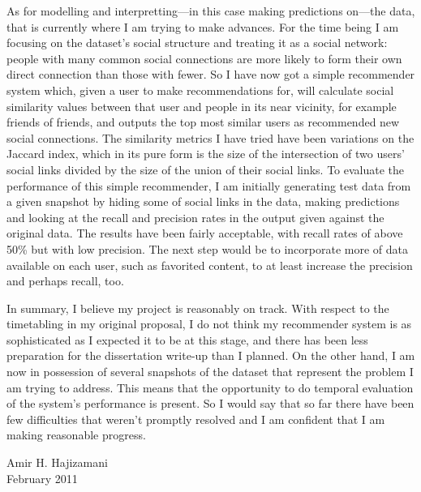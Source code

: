 \documentclass[a4paper,11pt,titlepage]{article}
\begin{document}
As for modelling and interpretting---in this case making predictions on---the data, that is currently where I am trying to make advances. For the time being I am focusing on the dataset's social structure and treating it as a social network: people with many common social connections are more likely to form their own direct connection than those with fewer. So I have now got a simple recommender system which, given a user to make recommendations for, will calculate social similarity values between that user and people in its near vicinity, for example friends of friends, and outputs the top most similar users as recommended new social connections. The similarity metrics I have tried have been variations on the Jaccard index, which in its pure form is the size of the intersection of two users' social links divided by the size of the union of their social links. To evaluate the performance of this simple recommender, I am initially generating test data from a given snapshot by hiding some of social links in the data, making predictions and looking at the recall and precision rates in the output given against the original data. The results have been fairly acceptable, with recall rates of above 50\% but with low precision. The next step would be to incorporate more of data available on each user, such as favorited content, to at least increase the precision and perhaps recall, too.

\bigskip

In summary, I believe my project is reasonably on track. With respect to the timetabling in my original proposal, I do not think my recommender system is as sophisticated as I expected it to be at this stage, and there has been less preparation for the dissertation write-up than I planned. On the other hand, I am now in possession of several snapshots of the dataset that represent the problem I am trying to address. This means that the opportunity to do temporal evaluation of the system's performance is present. So I would say that so far there have been few difficulties that weren't promptly resolved and I am confident that I am making reasonable progress.

\bigskip

\begin{flushright}
 Amir H. Hajizamani\\
 February 2011
\end{flushright}


\end{document}
